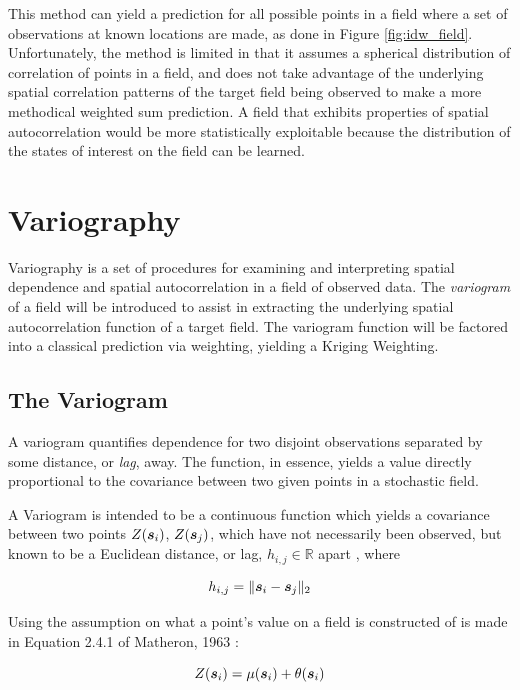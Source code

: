 This method can yield a prediction for all possible points in a field where a set of observations at known locations are made, as done in Figure \ref{fig:idw_field}. Unfortunately, the method is limited in that it assumes a spherical distribution of correlation of points in a field, and does not take advantage of the underlying spatial correlation patterns of the target field being observed to make a more methodical weighted sum prediction. A field that exhibits properties of spatial autocorrelation would be more statistically exploitable because the distribution of the states of interest on the field can be learned.

\section{Variography} \label{sec:vario}
Variography is a set of procedures for examining and interpreting spatial dependence and spatial autocorrelation in a field of observed data. The \textit{variogram} of a field will be introduced to assist in extracting the underlying spatial autocorrelation function of a target field. The variogram function will be factored into a classical prediction via weighting, yielding a Kriging Weighting.

\subsection{The Variogram}
A variogram quantifies dependence for two disjoint observations separated by some distance, or \textit{lag}, away. The function, in essence, yields a value directly proportional to the covariance between two given points in a stochastic field.

A Variogram is intended to be a continuous function which yields a covariance between two points $Z({\it{\boldsymbol{s}}}_{i})$, $Z({\it{\boldsymbol{s}}}_{j})$, which have not necessarily been observed, but known to be a Euclidean distance, or lag, $h_{i,j} \in \mathbb{R}$ apart \cite{deutsch:geostat}, where

\begin{equation}
h_{i,j} = \| {\it{\boldsymbol{s}}}_i - {\it{\boldsymbol{s}}}_j \|_2
\label{eq:hdist}
\end{equation}

Using the assumption on what a point's value on a field is constructed of is made in Equation 2.4.1 of Matheron, 1963 \cite{matheron:geostat}:

\begin{equation}
    Z({\it{\boldsymbol{s}}}_i)=\mu({\it{\boldsymbol{s}}}_i)+\theta({\it{\boldsymbol{s}}}_i)
    \label{eq:matheron:assum}
\end{equation}

